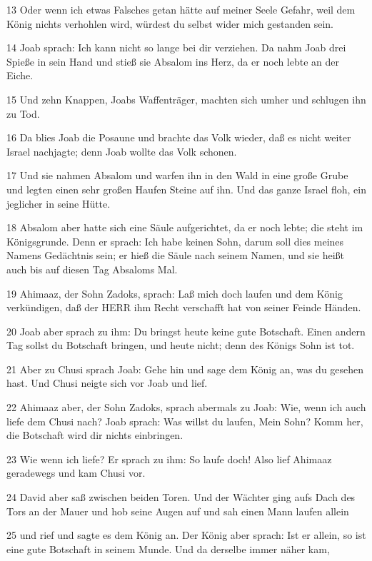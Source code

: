 \par 13 Oder wenn ich etwas Falsches getan hätte auf meiner Seele Gefahr, weil dem König nichts verhohlen wird, würdest du selbst wider mich gestanden sein.
\par 14 Joab sprach: Ich kann nicht so lange bei dir verziehen. Da nahm Joab drei Spieße in sein Hand und stieß sie Absalom ins Herz, da er noch lebte an der Eiche.
\par 15 Und zehn Knappen, Joabs Waffenträger, machten sich umher und schlugen ihn zu Tod.
\par 16 Da blies Joab die Posaune und brachte das Volk wieder, daß es nicht weiter Israel nachjagte; denn Joab wollte das Volk schonen.
\par 17 Und sie nahmen Absalom und warfen ihn in den Wald in eine große Grube und legten einen sehr großen Haufen Steine auf ihn. Und das ganze Israel floh, ein jeglicher in seine Hütte.
\par 18 Absalom aber hatte sich eine Säule aufgerichtet, da er noch lebte; die steht im Königsgrunde. Denn er sprach: Ich habe keinen Sohn, darum soll dies meines Namens Gedächtnis sein; er hieß die Säule nach seinem Namen, und sie heißt auch bis auf diesen Tag Absaloms Mal.
\par 19 Ahimaaz, der Sohn Zadoks, sprach: Laß mich doch laufen und dem König verkündigen, daß der HERR ihm Recht verschafft hat von seiner Feinde Händen.
\par 20 Joab aber sprach zu ihm: Du bringst heute keine gute Botschaft. Einen andern Tag sollst du Botschaft bringen, und heute nicht; denn des Königs Sohn ist tot.
\par 21 Aber zu Chusi sprach Joab: Gehe hin und sage dem König an, was du gesehen hast. Und Chusi neigte sich vor Joab und lief.
\par 22 Ahimaaz aber, der Sohn Zadoks, sprach abermals zu Joab: Wie, wenn ich auch liefe dem Chusi nach? Joab sprach: Was willst du laufen, Mein Sohn? Komm her, die Botschaft wird dir nichts einbringen.
\par 23 Wie wenn ich liefe? Er sprach zu ihm: So laufe doch! Also lief Ahimaaz geradewegs und kam Chusi vor.
\par 24 David aber saß zwischen beiden Toren. Und der Wächter ging aufs Dach des Tors an der Mauer und hob seine Augen auf und sah einen Mann laufen allein
\par 25 und rief und sagte es dem König an. Der König aber sprach: Ist er allein, so ist eine gute Botschaft in seinem Munde. Und da derselbe immer näher kam,
